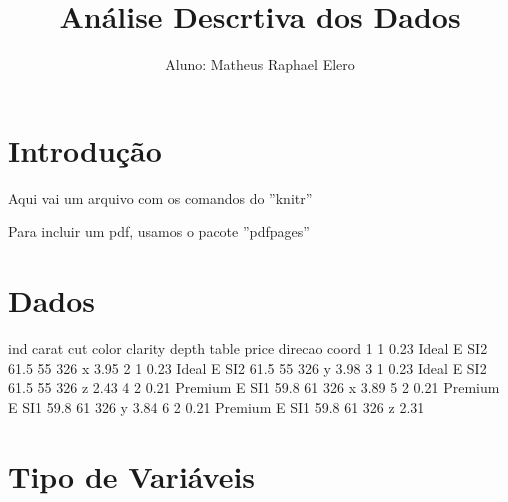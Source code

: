 \documentclass[a4paper,12pt]{article}
\begin{document}








\title{Análise Descrtiva dos Dados}

\author{Aluno: Matheus Raphael Elero}

\maketitle

\section{Introdução}

Aqui vai um arquivo com os comandos do ''knitr''

Para incluir um pdf, usamos o pacote ''pdfpages''



\section{Dados}


\begin{Schunk}
\begin{Soutput}
  ind carat     cut color clarity depth table price direcao coord
1   1  0.23   Ideal     E     SI2  61.5    55   326       x  3.95
2   1  0.23   Ideal     E     SI2  61.5    55   326       y  3.98
3   1  0.23   Ideal     E     SI2  61.5    55   326       z  2.43
4   2  0.21 Premium     E     SI1  59.8    61   326       x  3.89
5   2  0.21 Premium     E     SI1  59.8    61   326       y  3.84
6   2  0.21 Premium     E     SI1  59.8    61   326       z  2.31
\end{Soutput}
\end{Schunk}

\section{Tipo de Variáveis}

\begin{Schunk}
\end{Schunk}
\end{document}
